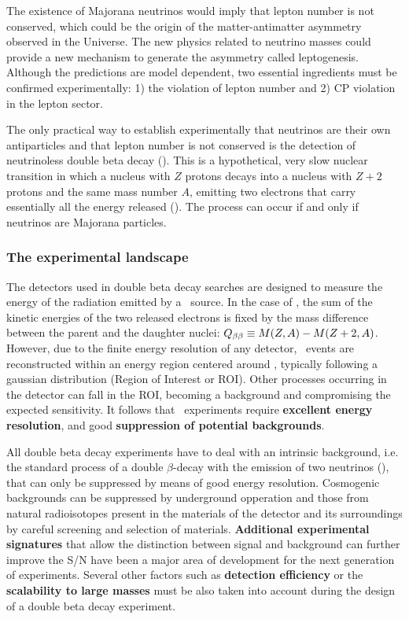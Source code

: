 \documentclass[a4paper,11pt,oneside]{article}
\begin{document}
The existence of Majorana neutrinos would imply that lepton number is not conserved, which could be the origin of the matter-antimatter asymmetry observed in the Universe. The new physics related to neutrino masses could provide a new mechanism to generate the asymmetry called leptogenesis. Although the predictions are model dependent, two essential ingredients must be confirmed experimentally: 1) the violation of lepton number and 2) CP violation in the lepton sector. 

The only practical way to establish experimentally that neutrinos are their own antiparticles and that lepton number is not conserved is the detection of neutrinoless double beta decay (\bbonu). This is a hypothetical, very slow nuclear transition in which a nucleus with $Z$ protons decays into a nucleus with $Z+2$ protons and the same mass number $A$, emitting two electrons that carry essentially all the energy released (\Qbb). The process can occur if and only if neutrinos are Majorana particles.

\subsubsection*{The experimental landscape}
The detectors used in double beta decay searches are designed to measure the energy of the radiation emitted by a \bb\ source. In the case of \bbonu, the sum of the kinetic energies of the two released electrons is fixed by the mass difference between the parent and the daughter nuclei: $Q_{\beta\beta} \equiv M(Z,A)-M(Z+2,A)$. However, due to the finite energy resolution of any detector, \bbonu\ events are reconstructed within an energy region centered around \Qbb, typically following a gaussian distribution (Region of Interest or ROI). Other processes occurring in the detector can fall in the ROI, becoming a background and compromising the expected sensitivity. It follows that \bbonu\ experiments require {\bf excellent energy resolution}, and good {\bf suppression of potential backgrounds}.

All double beta decay experiments have to deal with an intrinsic background, i.e. the standard process of a double $\beta$-decay with the emission of two neutrinos (\bbtnu), that can only be suppressed by means of good energy resolution. Cosmogenic backgrounds can be suppressed by underground opperation and those from natural radioisotopes present in the materials of the detector and its surroundings by careful screening and selection of materials. {\bf Additional experimental signatures} that allow the distinction between signal and background can further improve the S/N have been a major area of development for the next generation of experiments. Several other factors such as {\bf detection efficiency} or the {\bf scalability to large masses} must be also taken into account during the design of a double beta decay experiment.
 
\end{document}
